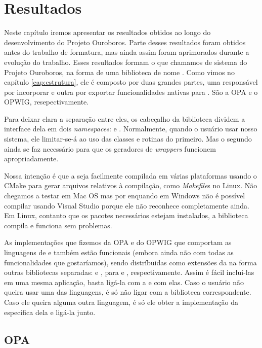 \chapter{Resultados}
\label{cap:resultados}

Neste capítulo iremos apresentar os resultados obtidos ao longo do
desenvolvimento do Projeto Ouroboros. Parte desses resultados foram
obtidos antes do trabalho de formatura, mas ainda assim foram aprimorados
durante a evolução do trabalho. Esses resultados formam o que
chamamos de sistema do Projeto Ouroboros, na forma de uma biblioteca \CXX{}
de nome . Como vimos no capítulo \ref{cap:estrutura},
ele é composto por duas grandes partes, uma responsável por incorporar
 e outra por exportar funcionalidades nativas para .
São a OPA e o OPWIG, resepectivamente.

Para deixar clara a separação entre eles, os cabeçalho da biblioteca
dividem a interface dela em dois \textit{namespaces}:  e .
Normalmente, quando o usuário usar nosso sistema, ele limitar-se-á ao uso
das classes e rotinas do primeiro. Mas o segundo ainda se faz necessário
para que os geradores de \textit{wrappers} funcionem apropriadamente.

Nossa intenção é que a  seja facilmente compilada em várias plataformas
usando o CMake para gerar arquivos relativos à compilação, como \textit{Makefile}s
no Linux. Não chegamos a testar em Mac OS mas por enquando em Windows não é
possível compilar usando Visual Studio porque ele não reconhece  completamente
ainda. Em Linux, contanto que os pacotes necessários estejam instalados, a biblioteca
compila e funciona sem problemas.

As implementações que fizemos da OPA e do OPWIG que comportam as linguagens de
\script{}  e  também estão funcionais (embora ainda não
com todas as funcionalidades que gostaríamos), sendo distríbuidas como extensões
da  na forma outras bibliotecas separadas: 
e , para  e , respectivamente.
Assim é fácil incluí-las em uma mesma aplicação, basta ligá-la com a
 e com elas. Caso o usuário não queira usar uma das linguagens,
é só não ligar com a biblioteca correspondente. Caso ele queira alguma outra
linguagem, é só ele obter a implementação da  específica dela
e ligá-la junto.

\section{OPA}
\label{cap:resultados:opa}


